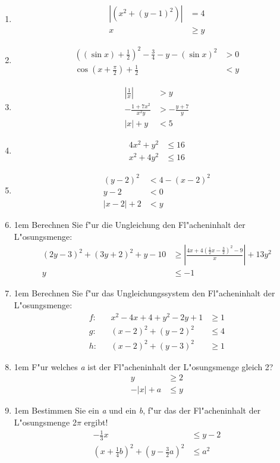 \begin{enumerate}
\item{ \begin{align*}|(x^2 + (y-1)^2)| &= 4\\ x &\geq y\end{align*}}
\item{ \begin{align*}((\sin{x})+\frac{1}{2})^2 - \frac{3}{4} - y - (\sin{x})^2 &> 0\\ \cos{(x+\frac{\pi}{2})} + \frac{1}{2} &< y\end{align*}}
\item{ \begin{align*}\left| \frac{1}{x} \right| &> y\\ -\frac{1+7x^2}{x^2y} &> -\frac{y + 7}{y}\\ |x|+y &< 5\end{align*}}
\item{ \begin{align*}4x^2 + y^2 &\leq 16\\ x^2 + 4y^2 &\leq 16\end{align*}}
\item{ \begin{align*}(y-2)^2 &< 4 - (x-2)^2\\ y-2 &< 0\\ |x-2|+2 &< y\end{align*}}
\item{\abovedisplayskip1em Berechnen Sie f"ur die Ungleichung den Fl"acheninhalt der L"osungsmenge: \begin{align*}(2y-3)^2 +(3y+2)^2+y-10 &\geq \left|\frac{4x+4(\frac{1}{2}x-\frac{3}{2})^2-9}{x}\right|+13y^2\\ y &\leq -1\end{align*}}
\item{\abovedisplayskip1em Berechnen Sie f"ur das Ungleichungssystem den Fl"acheninhalt der L"osungsmenge: \begin{align*}f:& &x^2 - 4x + 4 + y^2 -2y + 1 &\geq 1\\ g:& &(x-2)^2 + (y-2)^2 &\leq 4\\ h:& &(x-2)^2 + (y-3)^2 &\geq 1\end{align*}}
\item{\abovedisplayskip1em F"ur welches \textit{a} ist der Fl"acheninhalt der L"osungsmenge gleich 2? \begin{align*}y &\geq 2\\ -|x|+a &\leq y\end{align*}}
\item{\abovedisplayskip1em Bestimmen Sie ein \textit{a} und ein \textit{b}, f"ur das der Fl"acheninhalt der L"osungsmenge 2$\pi$ ergibt! \begin{align*}-\frac{1}{3}x &\leq y-2\\ (x+\frac{1}{4}b)^2 + (y-\frac{3}{2}a)^2 &\leq a^2\end{align*}}

\end{enumerate}
